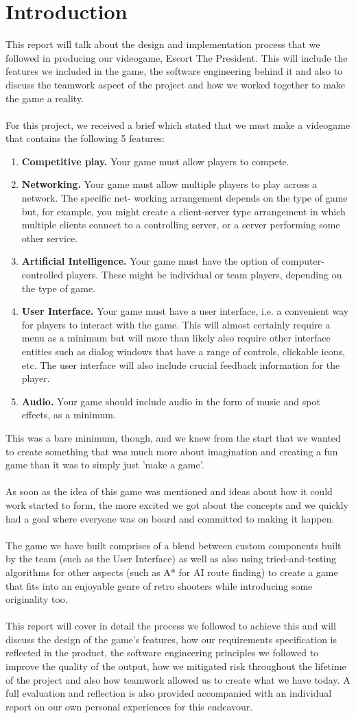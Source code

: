 \documentclass[12pt]{article}
\newcommand{\return}{\\\\\noindent}
\begin{document}
\section{Introduction}
This report will talk about the design and implementation process that we followed in producing our videogame, Escort The President. This will include the features we included in the game, the software engineering behind it and also to discuss the teamwork aspect of the project and how we worked together to make the game a reality.\return
For this project, we received a brief which stated that we must make a videogame that contains the following 5 features:
\begin{enumerate}
\item \textbf{Competitive play.} Your game must allow players to compete.
\item \textbf{Networking.} Your game must allow multiple players to play across a network. The specific net-
working arrangement depends on the type of game but, for example, you might create a client-server type
arrangement in which multiple clients connect to a controlling server, or a server performing some other
service.
\item \textbf{Artificial Intelligence.} Your game must have the option of computer-controlled players. These might
be individual or team players, depending on the type of game.
\item \textbf{User Interface.} Your game must have a user interface, i.e. a convenient way for players to interact
with the game. This will almost certainly require a menu as a minimum but will more than likely also
require other interface entities such as dialog windows that have a range of controls, clickable icons, etc.
The user interface will also include crucial feedback information for the player.
\item \textbf{Audio.} Your game should include audio in the form of music and spot effects, as a minimum.
\end{enumerate}
This was a bare minimum, though, and we knew from the start that we wanted to create something that was much more about imagination and creating a fun game than it was to simply just 'make a game'.\return
As soon as the idea of this game was mentioned and ideas about how it could work started to form, the more excited we got about the concepts and we quickly had a goal where everyone was on board and committed to making it happen.\return
The game we have built comprises of a blend between custom components built by the team (such as the User Interface) as well as also using tried-and-testing algorithms for other aspects (such as A* for AI route finding) to create a game that fits into an enjoyable genre of retro shooters while introducing some originality too.\return
This report will cover in detail the process we followed to achieve this and will discuss the design of the game's features, how our requirements specification is reflected in the product, the software engineering principles we followed to improve the quality of the output, how we mitigated risk throughout the lifetime of the project and also how teamwork allowed us to create what we have today. A full evaluation and reflection is also provided accompanied with an individual report on our own personal experiences for this endeavour.
\newpage
\end{document}
